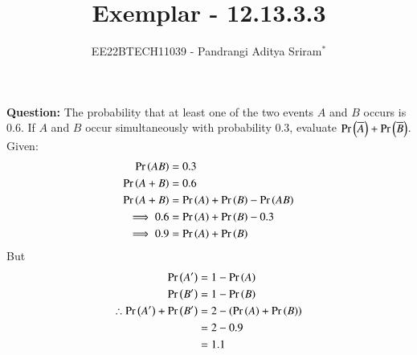 \documentclass[journal,12pt,twocolumn]{IEEEtran}
\theoremstyle{remark}
\begin{document}

\vspace{3cm}

\title{Exemplar - 12.13.3.3}
\author{EE22BTECH11039 - Pandrangi Aditya Sriram$^{*}$%
}
\maketitle
\newpage
\bigskip

\renewcommand{\thefigure}{\theenumi}
\renewcommand{\thetable}{\theenumi}


\vspace{3cm}
\textbf{Question:} The probability that at least one of the two events $A$ and $B$ occurs is 0.6. If $A$ and $B$ occur simultaneously with probability 0.3, evaluate $\Pr\left(\overline{A}\right) + \Pr\left(\overline{B}\right)$.\\
\solution
Given:
\begin{align}
    \Pr\left(AB\right) &= 0.3\\
    \Pr\left(A + B\right) &= 0.6\\
    \Pr\left(A + B\right) &=  \Pr\left(A\right) + \Pr\left(B\right) - \Pr\left(AB\right)\\
    \implies 0.6 &= \Pr\left(A\right) + \Pr\left(B\right) - 0.3\\
    \implies 0.9 &= \Pr\left(A\right) + \Pr\left(B\right)
\end{align}
But
\begin{align}
    \Pr\left(A'\right) &= 1 - \Pr\left(A\right)\\
    \Pr\left(B'\right) &= 1 - \Pr\left(B\right)\\
    \therefore \Pr\left(A'\right) + \Pr\left(B'\right) &= 2 - \left(\Pr\left(A\right) + \Pr\left(B\right)\right)\\
    &= 2 - 0.9\\
    &= 1.1
\end{align}
\end{document}
